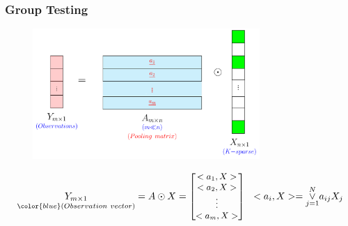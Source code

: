 \begin{frame} \frametitle{Group Testing}

\begin{figure}[t]
\centering
\includegraphics[width=3.4in]{./Figures/A_times_X_group_testing.pdf}
\end{figure}



\begin{block}
		
		
	
	{
		\[ \small \underset{\color{blue}(Observation \ vector)}{Y_{m \times 1}} = A \odot X = \begin{bmatrix}
		{<a_1,X>} \\
		{<a_2,X>}  \\
		\vdots  \\
		{<a_m,X>}
		\end{bmatrix} \ \   <a_i , X> = \overset{N}{\underset{j=1 }{\vee}} a_{ij}X_j  \] }
		
\end{block}


\end{frame}

